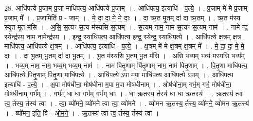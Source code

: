 \documentclass[17pt]{extarticle}
\begin{document}
28. आधि॑पत्ये प्र॒जाम् प्र॒जा माधि॑पत्य॒ आधि॑पत्ये प्र॒जाम् । . आधि॑पत्य॒ इत्याधि॑ - प॒त्ये॒ । . प्र॒जाम् मे॑ मे प्र॒जाम् प्र॒जाम् मे᳚ । . प्र॒जामिति॑ प्र - जाम् । . मे॒ दा॒ दा॒ मे॒ मे॒ दाः॒ । . दा॒ ऋ॒त मृ॒तम् दा॑ दा ऋ॒तम् । . ऋ॒त म॑स्य स्यृ॒त मृ॒त म॑सि । . अ॒सि॒ स॒त्यꣳ स॒त्य म॑स्यसि स॒त्यम् । . स॒त्यम् नाम॒ नाम॑ स॒त्यꣳ स॒त्यम् नाम॑ । . नामे न्द्र॒ स्येन्द्र॑स्य॒ नाम॒ नामेन्द्र॑स्य । . इन्द्र॒ स्याधि॑पत्य॒ आधि॑पत्य॒ इन्द्र॒ स्येन्द्र॒ स्याधि॑पत्ये । . आधि॑पत्ये क्ष॒त्रम् क्ष॒त्र माधि॑पत्य॒ आधि॑पत्ये क्ष॒त्रम् । . आधि॑पत्य॒ इत्याधि॑ - प॒त्ये॒ । . क्ष॒त्रम् मे॑ मे क्ष॒त्रम् क्ष॒त्रम् मे᳚ । . मे॒ दा॒ दा॒ मे॒ मे॒ दाः॒ । . दा॒ भू॒तम् भू॒तम् दा॑ दा भू॒तम् । . भू॒त म॑स्यसि भू॒तम् भू॒त म॑सि । . अ॒सि॒ भव्य॒म् भव्य॑ मस्यसि॒ भव्य᳚म् । . भव्य॒म् नाम॒ नाम॒ भव्य॒म् भव्य॒म् नाम॑ । . नाम॑ पितृ॒णाम् पि॑तृ॒णाम् नाम॒ नाम॑ पितृ॒णाम् । . पि॒तृ॒णा माधि॑पत्य॒ आधि॑पत्ये पितृ॒णाम् पि॑तृ॒णा माधि॑पत्ये । . आधि॑पत्ये॒ ऽपा म॒पा माधि॑पत्य॒ आधि॑पत्ये॒ ऽपाम् । . आधि॑पत्य॒ इत्याधि॑ - प॒त्ये॒ । . अ॒पा मोष॑धीना॒ मोष॑धीना म॒पा म॒पा मोष॑धीनाम् । . ओष॑धीना॒म् गर्भ॒म् गर्भ॒ मोष॑धीना॒ मोष॑धीना॒म् गर्भ᳚म् । . गर्भ॑म् धा धा॒ गर्भ॒म् गर्भ॑म् धाः । . धा॒ ऋ॒तस्य॒ र्तस्य॑ धा धा ऋ॒तस्य॑ । . ऋ॒तस्य॑ त्वा त्व॒ र्तस्य॒ र्तस्य॑ त्वा । . त्वा॒ व्यो॑मने॒ व्यो॑मने त्वा त्वा॒ व्यो॑मने । . व्यो॑मन ऋ॒तस्य॒ र्तस्य॒ व्यो॑मने॒ व्यो॑मन ऋ॒तस्य॑ । . व्यो॑मन॒ इति॒ वि - ओ॒म॒ने॒ । . ऋ॒तस्य॑ त्वा त्व॒ र्तस्य॒ र्तस्य॑ त्वा । \newline
\end{document}
